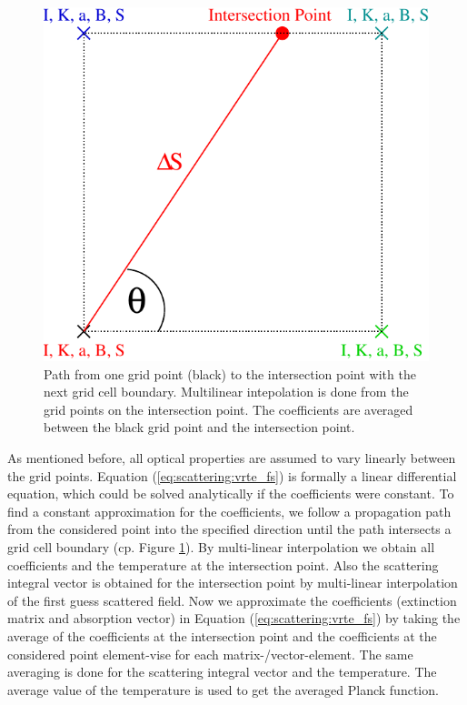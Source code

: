 \begin{figure}[htbp]
 \begin{center}
  \begin{minipage}[c]{0.65\textwidth}
   \begin{center}
    \includegraphics*[width=0.9\hsize]{Figs/scattering/average}
   \end{center}
  \end{minipage}%
  \begin{minipage}[c]{0.35\textwidth}
   \caption{Path from one grid point (black) to the intersection point with the next grid cell boundary. Multilinear intepolation is done from the grid points on the intersection point. The coefficients are averaged between the black grid point and the intersection point.}
   \label{fig:scattering:averaging}
  \end{minipage}
 \end{center}
\end{figure}   

As mentioned before, all optical properties are assumed to vary
linearly between the grid points. Equation (\ref{eq:scattering:vrte_fs}) is
formally a linear differential equation, which could be solved
analytically if the coefficients were constant.  To find a constant
approximation for the coefficients, we follow a propagation path from
the considered point into the specified direction until the path
intersects a grid cell boundary (cp. Figure \ref{fig:scattering:averaging}). By multi-linear interpolation we
obtain all coefficients and the temperature at the intersection point.
Also the scattering integral vector is obtained for the intersection
point by multi-linear interpolation of the first guess scattered
field. Now we approximate the coefficients (extinction matrix and
absorption vector) in Equation (\ref{eq:scattering:vrte_fs}) by taking the
average of the coefficients at the intersection point and the
coefficients at the considered point element-vise for each
matrix-/vector-element. The same averaging is done for the scattering
integral vector and the temperature. The average value of the
temperature is used to get the averaged Planck function.

